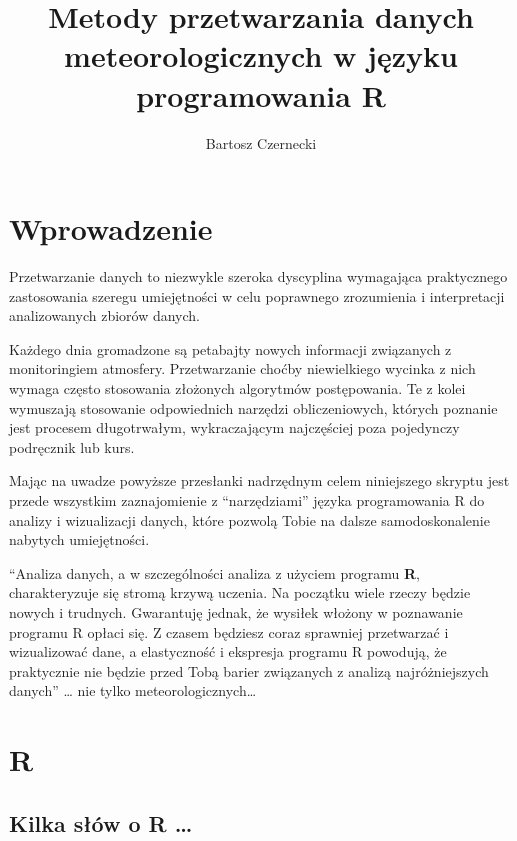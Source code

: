 \documentclass[]{book}
\title{Metody przetwarzania danych meteorologicznych w języku programowania R}
\author{Bartosz Czernecki}
\date{}
\theoremstyle{definition}
\theoremstyle{definition}
\theoremstyle{definition}
\theoremstyle{remark}
\begin{document}
\maketitle

{
\setcounter{tocdepth}{1}
\tableofcontents
}
\chapter*{Wprowadzenie}\label{wprowadzenie}

Przetwarzanie danych to niezwykle szeroka dyscyplina wymagająca
praktycznego zastosowania szeregu umiejętności w celu poprawnego
zrozumienia i interpretacji analizowanych zbiorów danych.

Każdego dnia gromadzone są petabajty nowych informacji związanych z
monitoringiem atmosfery. Przetwarzanie choćby niewielkiego wycinka z
nich wymaga często stosowania złożonych algorytmów postępowania. Te z
kolei wymuszają stosowanie odpowiednich narzędzi obliczeniowych, których
poznanie jest procesem długotrwałym, wykraczającym najczęściej poza
pojedynczy podręcznik lub kurs.

Mając na uwadze powyższe przesłanki nadrzędnym celem niniejszego skryptu
jest przede wszystkim zaznajomienie z ``narzędziami'' języka
programowania R do analizy i wizualizacji danych, które pozwolą Tobie na
dalsze samodoskonalenie nabytych umiejętności.

``Analiza danych, a w szczególności analiza z użyciem programu
\textbf{R}, charakteryzuje się stromą krzywą uczenia. Na początku wiele
rzeczy będzie nowych i trudnych. Gwarantuję jednak, że wysiłek włożony w
poznawanie programu R opłaci się. Z czasem będziesz coraz sprawniej
przetwarzać i wizualizować dane, a elastyczność i ekspresja programu R
powodują, że praktycznie nie będzie przed Tobą barier związanych z
analizą najróżniejszych danych'' \citep{biecek2016} \ldots{} nie tylko
meteorologicznych\ldots{}

\chapter{\texorpdfstring{\textbf{R}}{R}}\label{whyr}

\section{\texorpdfstring{Kilka słów o \textbf{R}
\ldots{}}{Kilka słów o R \ldots{}}}\label{kilka-sow-o-r}
\end{document}
